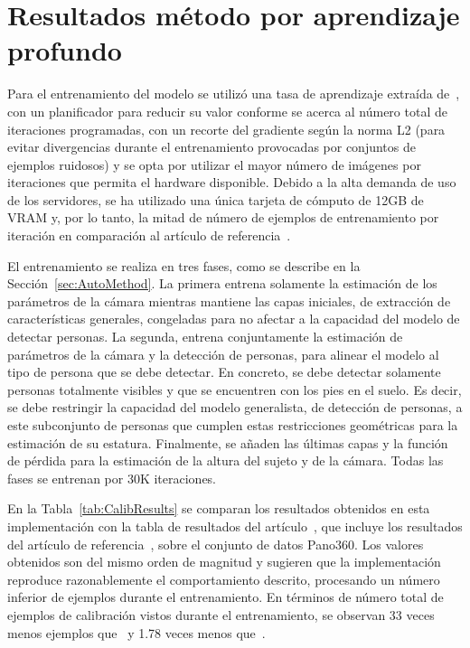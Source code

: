 \section{Resultados método por aprendizaje profundo}
Para el entrenamiento del modelo se utilizó una tasa de aprendizaje extraída de~\cite{goyal2018accuratelargeminibatchsgd},
con un planificador para reducir su valor conforme se acerca al número total de iteraciones programadas,
con un recorte del gradiente según la norma L2 (para evitar divergencias durante el entrenamiento provocadas por conjuntos de ejemplos
ruidosos) y se opta por utilizar el mayor número de imágenes por iteraciones que permita
el hardware disponible. Debido a la alta demanda de uso de los servidores, se ha utilizado
una única tarjeta de cómputo de 12GB de VRAM y, por lo tanto, la mitad de número de ejemplos de entrenamiento
por iteración en comparación al artículo de referencia~\cite{SVMIW}.
\par
El entrenamiento se realiza en tres fases, como se describe en la Sección~\ref{sec:AutoMethod}.
La primera entrena solamente la estimación de los parámetros de la cámara mientras mantiene las capas iniciales,
de extracción de características generales, congeladas para no afectar a la capacidad del modelo de detectar personas.
La segunda, entrena conjuntamente la estimación de parámetros de la cámara y la detección de personas, para alinear el
modelo al tipo de persona que se debe detectar. En concreto, se debe detectar solamente personas totalmente visibles y que se
encuentren con los pies en el suelo. Es decir, se debe restringir la capacidad del modelo generalista, de detección de personas,
a este subconjunto de personas que cumplen estas restricciones geométricas para la estimación de su estatura.
Finalmente, se añaden las últimas capas y la función de pérdida para la estimación de la altura del sujeto y de la cámara.
Todas las fases se entrenan por 30K iteraciones.
\par
En la Tabla~\ref{tab:CalibResults} se comparan los resultados obtenidos en esta implementación
con la tabla de resultados del artículo~\cite{SPEC}, que incluye los resultados del artículo de referencia~\cite{SVMIW},
sobre el conjunto de datos Pano360.
Los valores obtenidos son del mismo orden de magnitud y sugieren que la
implementación reproduce razonablemente el comportamiento descrito, procesando un número inferior de ejemplos durante el entrenamiento.
En términos de número total de ejemplos de calibración vistos durante el entrenamiento, se observan 33 veces menos ejemplos que~\cite{SPEC} y 1.78 veces menos que~\cite{SVMIW}.
